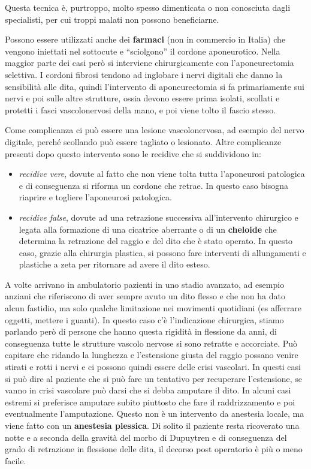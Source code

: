 \documentclass[]{article}
\begin{document}
Questa tecnica è, purtroppo, molto spesso dimenticata o non conosciuta
dagli specialisti, per cui troppi malati non possono beneficiarne.

Possono essere utilizzati anche dei \textbf{farmaci} (non in commercio
in Italia) che vengono iniettati nel sottocute e ``sciolgono'' il
cordone aponeurotico. Nella maggior parte dei casi però si interviene
chirurgicamente con l'aponeurectomia selettiva. I cordoni fibrosi
tendono ad inglobare i nervi digitali che danno la sensibilità alle
dita, quindi l'intervento di aponeurectomia si fa primariamente sui
nervi e poi sulle altre strutture, ossia devono essere prima isolati,
scollati e protetti i fasci vascolonervosi della mano, e poi viene tolto
il fascio stesso.

Come complicanza ci può essere una lesione vascolonervosa, ad esempio
del nervo digitale, perché scollando può essere tagliato o lesionato.
Altre complicanze presenti dopo questo intervento sono le recidive che
si suddividono in:

\begin{itemize}
\item
  \emph{recidive vere}, dovute al fatto che non viene tolta tutta
  l'aponeurosi patologica e di conseguenza si riforma un cordone che
  retrae. In questo caso bisogna riaprire e togliere l'aponeurosi
  patologica.
\item
  \emph{recidive false}, dovute ad una retrazione successiva
  all'intervento chirurgico e legata alla formazione di una cicatrice
  aberrante o di un \textbf{cheloide} che determina la retrazione del
  raggio e del dito che è stato operato. In questo caso, grazie alla
  chirurgia plastica, si possono fare interventi di allungamenti e
  plastiche a zeta per ritornare ad avere il dito esteso.
\end{itemize}

A volte arrivano in ambulatorio pazienti in uno stadio avanzato, ad
esempio anziani che riferiscono di aver sempre avuto un dito flesso e
che non ha dato alcun fastidio, ma solo qualche limitazione nei
movimenti quotidiani (es afferrare oggetti, mettere i guanti). In questo
caso c'è l'indicazione chirurgica, stiamo parlando però di persone che
hanno questa rigidità in flessione da anni, di conseguenza tutte le
strutture vascolo nervose si sono retratte e accorciate. Può capitare
che ridando la lunghezza e l'estensione giusta del raggio possano venire
stirati e rotti i nervi e ci possono quindi essere delle crisi
vascolari. In questi casi si può dire al paziente che si può fare un
tentativo per recuperare l'estensione, se vanno in crisi vascolare può
darsi che si debba amputare il dito. In alcuni casi estremi si
preferisce amputare subito piuttosto che fare il raddrizzamento e poi
eventualmente l'amputazione. Questo non è un intervento da anestesia
locale, ma viene fatto con un \textbf{anestesia plessica}. Di solito il
paziente resta ricoverato una notte e a seconda della gravità del morbo
di Dupuytren e di conseguenza del grado di retrazione in flessione delle
dita, il decorso post operatorio è più o meno facile.
\end{document}
